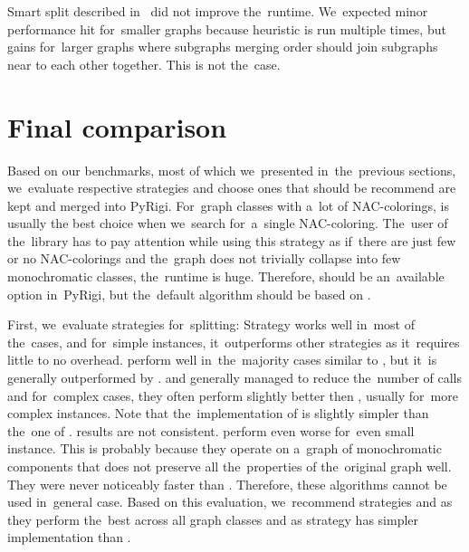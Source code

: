 Smart split described in~
did not improve the~runtime.
We~expected minor performance hit for~smaller graphs because heuristic is run
multiple times, but gains for~larger graphs where subgraphs merging order
should join subgraphs near to each other together. This is not the~case.

\section{Final comparison}

Based on our benchmarks, most of which we~presented in~the~previous sections,
we~evaluate respective strategies and choose ones
that should be recommend are kept and merged into PyRigi.
%
For~graph classes with a~lot of NAC-colorings,
\NaiveCycles{} is usually the best choice
when we~search for~a~single NAC-coloring.
%
The~user of the~library has to pay attention while using this strategy
as if~there are just few or no NAC-colorings and the~graph does not trivially collapse
into few monochromatic classes, the~runtime is huge.
Therefore, \NaiveCycles{} should be an~available option in~PyRigi,
but the~default algorithm should be based on \Subgraphs{}.

First, we~evaluate strategies for~splitting:
Strategy \None{} works well in~most of the~cases, and for~simple
instances, it~outperforms other strategies as it~requires little to no overhead.
%
\CyclesMatchChunks{} perform well in~the~majority cases similar to \None{},
but it~is generally outperformed by \Neighbors{}.
%
\Neighbors{} and \NeighborsDegree{} generally managed to reduce the~number
of \IsNACColoring{} calls and for~complex cases, they often
perform slightly better then \None{}, usually for~more complex instances.
Note that the~implementation of \Neighbors{} is slightly simpler than
the~one of \NeighborsDegree{}.
%
\KernighanLin{} results are not consistent.
\Cuts{} perform even worse for~even small instance.
This is probably because they operate on a~graph of monochromatic
components that does not preserve all the~properties
of the~original graph well.
They were never noticeably faster than \Neighbors{}.
Therefore, these algorithms cannot be used in~general case.
%
Based on this evaluation, we~recommend strategies \None{} and \Neighbors{}
as they perform the~best across all graph classes and
as \Neighbors{} strategy has simpler implementation than \NeighborsDegree{}.

